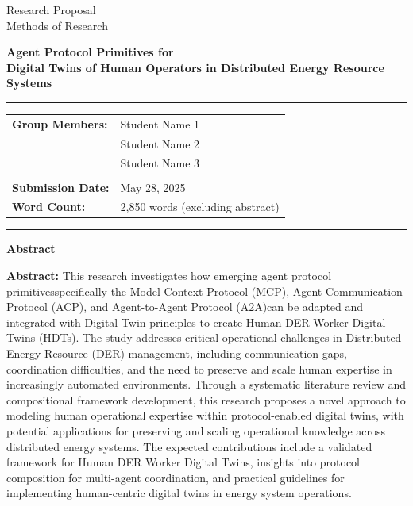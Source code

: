 \documentclass[12pt,a4paper]{article}
\newcommand{\studentone}{Student Name 1}
\newcommand{\studenttwo}{Student Name 2}
\newcommand{\studentthree}{Student Name 3}
\newcommand{\projecttitle}{Agent Protocol Primitives for \\Digital Twins of Human Operators in Distributed Energy Resource Systems}
\newcommand{\submissiondate}{May 28, 2025}
\newcommand{\emdash}{\textemdash}
\begin{document}
\begin{titlepage}
\begin{center}
{\Huge Research Proposal} \\
\vspace{5mm}
{\Large Methods of Research} \\

\vspace{10mm}

{\huge\textbf{\projecttitle}} \\

\vspace{15mm}

\hrule
\vspace{3mm}
\begin{tabular}{ll}
\textbf{Group Members:} & {\studentone} \\
& {\studenttwo} \\
& {\studentthree} \\
\\
\textbf{Submission Date:} & {\submissiondate} \\
\textbf{Word Count:} & 2,850 words (excluding abstract) \\
\end{tabular}
\vspace{3mm}
\hrule

\vspace{15mm}

\textbf{Abstract} \\
\vspace{2mm}
\begin{minipage}{0.8\textwidth}
\textbf{Abstract:} This research investigates how emerging agent protocol primitives\emdash{}specifically the Model Context Protocol (MCP), Agent Communication Protocol (ACP), and Agent-to-Agent Protocol (A2A)\emdash{}can be adapted and integrated with Digital Twin principles to create Human DER Worker Digital Twins (HDTs). The study addresses critical operational challenges in Distributed Energy Resource (DER) management, including communication gaps, coordination difficulties, and the need to preserve and scale human expertise in increasingly automated environments. Through a systematic literature review and compositional framework development, this research proposes a novel approach to modeling human operational expertise within protocol-enabled digital twins, with potential applications for preserving and scaling operational knowledge across distributed energy systems. The expected contributions include a validated framework for Human DER Worker Digital Twins, insights into protocol composition for multi-agent coordination, and practical guidelines for implementing human-centric digital twins in energy system operations.
\end{minipage}

\end{center}
\end{titlepage}
\end{document}

